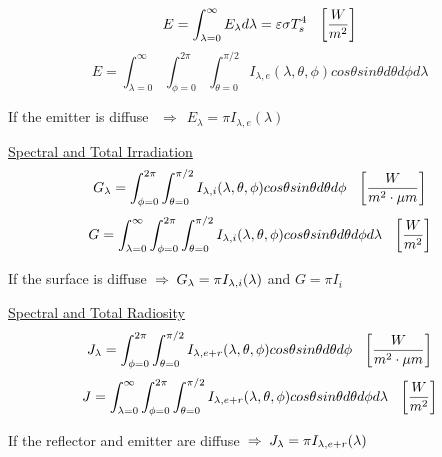 \documentclass[twocolumn, 12pt]{article}
\begin{document}
\begin{equation*}
    E = \int_{\lambda=0}^\infty E_\lambda d\lambda = \varepsilon \sigma T_s^4 \hspace{7.5pt} \left[ \frac{W}{m^2} \right]
\end{equation*}
\begin{equation*}
     E = \int_{\lambda=0}^\infty \int_{\phi=0}^{2\pi}  \int_{\theta=0}^{\pi/2} I_{\lambda,e} (\lambda,\theta,\phi) cos \theta sin \theta d\theta d\phi d\lambda 
\end{equation*}
\begin{center}
   If the emitter is diffuse \(\hspace{5pt} \Longrightarrow  \hspace{5pt} E_\lambda = \pi I_{\lambda,e}(\lambda)\) 
\end{center}
\underline{Spectral and Total Irradiation}
\begin{equation*}
    G_\lambda =  \int_{\phi=0}^{2\pi}  \int_{\theta=0}^{\pi/2} I_{\lambda,i} (\lambda,\theta,\phi) cos \theta sin \theta d\theta d\phi \hspace{7.5pt} \left[ \frac{W}{m^2 \cdot \mu m} \right]
\end{equation*}
\begin{equation*}
    G = \int_{\lambda=0}^\infty \int_{\phi=0}^{2\pi}  \int_{\theta=0}^{\pi/2} I_{\lambda,i} (\lambda,\theta,\phi) cos \theta sin \theta d\theta d\phi d\lambda \hspace{7.5pt} \left[ \frac{W}{m^2} \right]
\end{equation*}
\begin{center}
   If the surface is diffuse \(\hspace{2.5pt} \Rightarrow  \hspace{2.5pt} G_\lambda = \pi I_{\lambda,i}(\lambda)\) and \(G=\pi I_i\)
\end{center}
\underline{Spectral and Total Radiosity}
\begin{equation*}
    J_\lambda = \int_{\phi=0}^{2\pi}  \int_{\theta=0}^{\pi/2} I_{\lambda,e+r} (\lambda,\theta,\phi) cos \theta sin \theta d\theta d\phi \hspace{7.5pt} \left[ \frac{W}{m^2 \cdot \mu m} \right]
\end{equation*}
\begin{equation*}
    J = \int_{\lambda=0}^\infty \int_{\phi=0}^{2\pi}  \int_{\theta=0}^{\pi/2} I_{\lambda,e+r} (\lambda,\theta,\phi) cos \theta sin \theta d\theta d\phi d\lambda \hspace{7.5pt} \left[ \frac{W}{m^2} \right]
\end{equation*}
\begin{center}
   If the reflector and emitter are diffuse \(\hspace{2.5pt} \Rightarrow  \hspace{2.5pt} J_\lambda = \pi I_{\lambda,e+r}(\lambda)\) 
\end{center}
\end{document}
